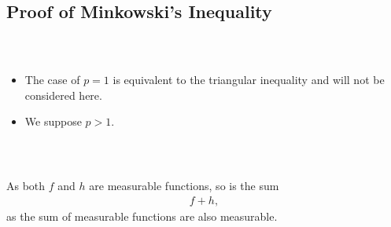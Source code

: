 \documentclass{beamer}
\numberwithin{equation}{section}
\begin{document}
\subsection{Proof of Minkowski's Inequality}

\begin{frame}\frametitle{{\normalsize \secname} \\ {\large \subsecname}}
    \begin{itemize}
        \item The case of $p = 1$ is equivalent to the triangular inequality and will not be considered here. 
        \item We suppose $p > 1$.
    \end{itemize}
\end{frame}

\begin{frame}\frametitle{{\normalsize \secname} \\ {\large \subsecname}}
    As both $f$ and $h$ are measurable functions, so is the sum
    \begin{align}
        f + h,
    \end{align}
    as the sum of measurable functions are also measurable.
\end{frame}
\end{document}
